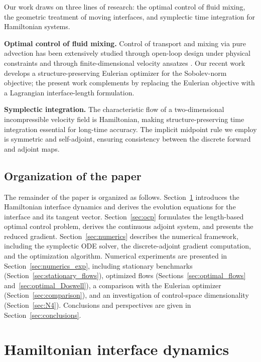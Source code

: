 \documentclass[12pt, reqno]{amsart}
\theoremstyle{plain}
\theoremstyle{definition}
\numberwithin{equation}{section}
\numberwithin{figure}{section}
\numberwithin{algorithm}{section}
\begin{document}
Our work draws on three lines of research: the optimal control of fluid mixing, the geometric treatment of moving interfaces, and symplectic time integration for Hamiltonian systems.

\textbf{Optimal control of fluid mixing.}
Control of transport and mixing via pure advection has been extensively studied through open-loop design under physical constraints \cite{d1999control, vikhansky2002enhancement} and through finite-dimensional velocity ansatzes \cite{mathew2007optimal}. Our recent work \cite{hu2026structure} develops a structure-preserving Eulerian optimizer for the Sobolev-norm objective; the present work complements \cite{hu2026structure} by replacing the Eulerian objective with a Lagrangian interface-length formulation.

\textbf{Symplectic integration.}
The characteristic flow of a two-dimensional incompressible velocity field is Hamiltonian, making structure-preserving time integration \cite{HLW06} essential for long-time accuracy. The implicit midpoint rule we employ is symmetric and self-adjoint, ensuring consistency between the discrete forward and adjoint maps.

\subsection{Organization of the paper}
The remainder of the paper is organized as follows. Section~\ref{sec:Hamiltonian} introduces the Hamiltonian interface dynamics and derives the evolution equations for the interface and its tangent vector. Section~\ref{sec:ocp} formulates the length-based optimal control problem, derives the continuous adjoint system, and presents the reduced gradient. Section~\ref{sec:numerics} describes the numerical framework, including the symplectic ODE solver, the discrete-adjoint gradient computation, and the optimization algorithm. Numerical experiments are presented in Section~\ref{sec:numerics_exp}, including stationary benchmarks (Section~\ref{sec:stationary_flows}), optimized flows (Sections~\ref{sec:optimal_flows} and~\ref{sec:optimal_Doswell}), a comparison with the Eulerian optimizer (Section~\ref{sec:comparison}), and an investigation of control-space dimensionality (Section~\ref{sec:N4}). Conclusions and perspectives are given in Section~\ref{sec:conclusions}.

\section{Hamiltonian interface dynamics}\label{sec:Hamiltonian}
\end{document}
